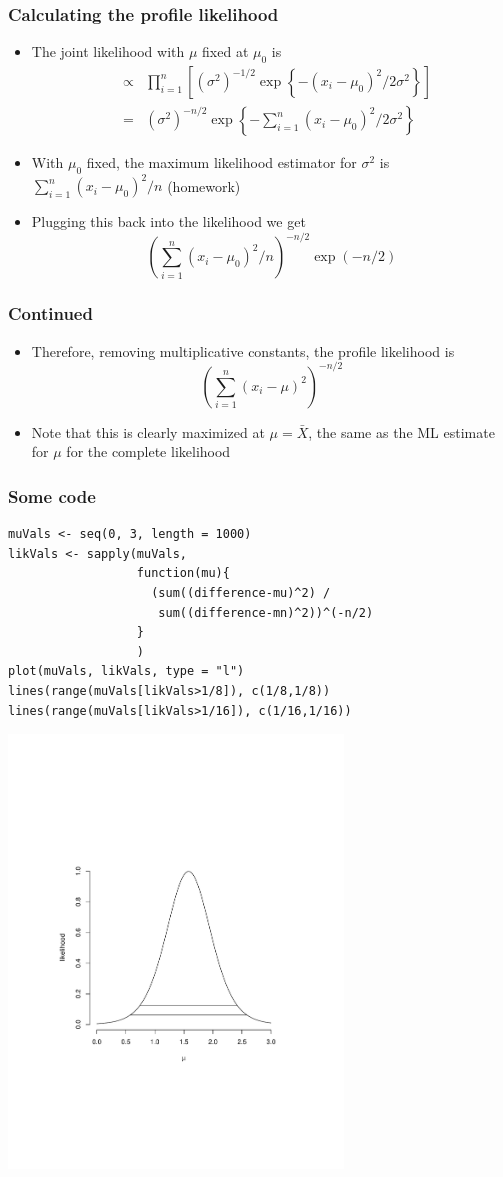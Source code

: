 \documentclass[aspectratio=169]{beamer}
\begin{document}
\begin{frame}\frametitle{Calculating the profile likelihood}
\begin{itemize}
\item The joint likelihood with $\mu$ fixed at $\mu_0$ is
  \begin{eqnarray*}
& \propto &\prod_{i=1}^n \left[(\sigma^2)^{-1/2}\exp\left\{-(x_i - \mu_0)^2/2\sigma^2 \right\} \right]\\
& = &  (\sigma^2)^{-n/2}\exp\left\{-\sum_{i=1}^n(x_i - \mu_0)^2/2\sigma^2 \right\}
  \end{eqnarray*}
\item With $\mu_0$ fixed, the maximum likelihood estimator for $\sigma^2$ is
  $\sum_{i=1}^n(x_i - \mu_0)^2 / n$ (homework)
\item Plugging this back into the likelihood we get
$$
\left(\sum_{i=1}^n(x_i - \mu_0)^2 / n \right)^{-n/2}\exp(-n/2)
$$
\end{itemize}
\end{frame}

\begin{frame}\frametitle{Continued}
\begin{itemize}
\item Therefore, removing multiplicative constants, the profile likelihood is 
  $$
  \left(\sum_{i=1}^n(x_i - \mu)^2 \right)^{-n/2}
  $$
\item Note that this is clearly maximized at $\mu=\bar X$, the same as the ML
  estimate for $\mu$ for the complete likelihood
\end{itemize}
\end{frame}

\begin{frame}[fragile]\frametitle{Some code}
\begin{verbatim}
muVals <- seq(0, 3, length = 1000)
likVals <- sapply(muVals,
                  function(mu){
                    (sum((difference-mu)^2) /
                     sum((difference-mn)^2))^(-n/2) 
                  }
                  )
plot(muVals, likVals, type = "l")
lines(range(muVals[likVals>1/8]), c(1/8,1/8))
lines(range(muVals[likVals>1/16]), c(1/16,1/16))
\end{verbatim}
\end{frame}

\begin{frame}
\includegraphics[width=3.5in]{normalProfileLikelihoodMean.pdf}
\end{frame}
\end{document}

